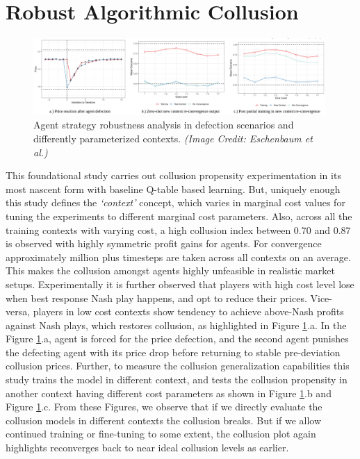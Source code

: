 \documentclass{article}
\begin{document}
\section{Robust Algorithmic Collusion}


\begin{figure}[h]
    \centering
    \includegraphics[width=0.99\textwidth]{study-one/collusion-reconvergence-curves.png}
    \caption{Agent strategy robustness analysis in defection scenarios and differently parameterized contexts. \textit{(Image Credit: Eschenbaum et al.)}}
    \label{fig:collusion-restore-curves}
\end{figure}


This foundational study carries out collusion propensity experimentation in its most nascent form with baseline Q-table based learning.
But, uniquely enough this study defines the \textit{`context’} concept, which varies in marginal cost values for tuning the experiments to different marginal cost parameters.
Also, across all the training contexts with varying cost, a high collusion index between 0.70 and 0.87 is observed with highly symmetric profit gains for agents.
For convergence approximately million plus timesteps are taken across all contexts on an average.
This makes the collusion amongst agents highly unfeasible in realistic market setups.
Experimentally it is further observed that players with high cost level lose when best response Nash play happens, and opt to reduce their prices.
Vice-versa, players in low cost contexts show tendency to achieve above-Nash profits against Nash plays, which restores collusion, as highlighted in Figure \ref{fig:collusion-restore-curves}.a.
In the Figure \ref{fig:collusion-restore-curves}.a, agent is forced for the price defection, and the second agent punishes the defecting agent with its price drop before returning to stable pre-deviation collusion prices.
Further, to measure the collusion generalization capabilities this study trains the model in different context, and tests the collusion propensity in another context having different cost parameters as shown in Figure \ref{fig:collusion-restore-curves}.b and Figure \ref{fig:collusion-restore-curves}.c.
From these Figures, we observe that if we directly evaluate the collusion models in different contexts the collusion breaks.
But if we allow continued training or fine-tuning to some extent, the collusion plot again highlights reconverges back to near ideal collusion levels as earlier.
\end{document}
